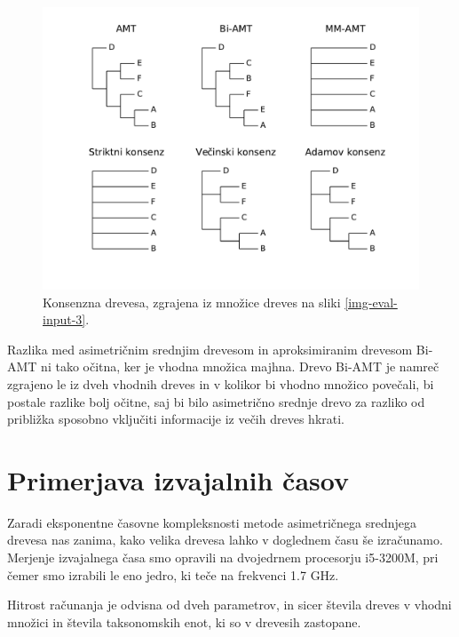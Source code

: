 \documentclass[a4paper, 12pt]{book}
\begin{document}
\begin{figure}
	\begin{center}
		\includegraphics[scale=0.6, clip=true, trim=1.5cm 1.5cm 1cm 0.8cm]{gfx/eval_gfx_3.pdf}
	\end{center}
	\caption{Konsenzna drevesa, zgrajena iz množice dreves na sliki \ref{img-eval-input-3}.}
	\label{img-eval-result-3}
\end{figure}

Razlika med asimetričnim srednjim drevesom in aproksimiranim drevesom Bi-AMT ni tako očitna, ker je vhodna množica majhna. Drevo Bi-AMT je namreč zgrajeno le iz dveh vhodnih dreves in v kolikor bi vhodno množico povečali, bi postale razlike bolj očitne, saj bi bilo asimetrično srednje drevo za razliko od približka sposobno vključiti informacije iz večih dreves hkrati.

\section{Primerjava izvajalnih časov}
Zaradi eksponentne časovne kompleksnosti metode asimetričnega srednjega drevesa nas zanima, kako velika drevesa lahko v doglednem času še izračunamo. Merjenje izvajalnega časa smo opravili na dvojedrnem procesorju i5-3200M, pri čemer smo izrabili le eno jedro, ki teče na frekvenci 1.7 GHz.

Hitrost računanja je odvisna od dveh parametrov, in sicer števila dreves v vhodni množici in števila taksonomskih enot, ki so v drevesih zastopane.
\end{document}
